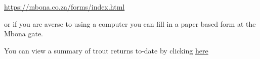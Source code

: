 \url{https://mbona.co.za/forms/index.html} 

or if you are averse to using a computer you can fill in a paper based form at the Mbona gate.

You can view a summary of trout returns to-date by clicking
\href{https://docs.google.com/forms/d/1sEDULvCp8kizs3bAFJkOdS2Endj0v8z1ZqG71hIuUVY/viewanalytics}{here}

%
%
%
%
%



